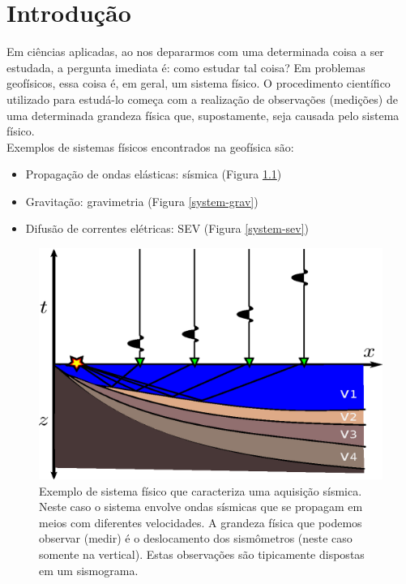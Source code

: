\chapter{Introdução}

\indent Em ciências aplicadas, ao nos depararmos com uma determinada coisa a ser
estudada, a pergunta imediata é: como estudar tal coisa? Em problemas geofísicos,
essa coisa é, em geral, um sistema físico. O procedimento científico utilizado
para estudá-lo começa com a realização de observações (medições) de uma
determinada grandeza física que, supostamente, seja causada pelo sistema físico.
\\
\indent Exemplos de sistemas físicos encontrados na geofísica são:

\begin{itemize}
    \item{Propagação de ondas elásticas: sísmica (Figura \ref{system-seismic})}
    \item{Gravitação: gravimetria (Figura \ref{system-grav})}
    \item{Difusão de correntes elétricas: SEV (Figura \ref{system-sev})}
\end{itemize}

\begin{figure}
    \centering
    \includegraphics[scale=1]{../figs/system-seismic.eps}
    \caption{Exemplo de sistema físico que caracteriza uma aquisição sísmica.
        Neste caso o sistema envolve ondas sísmicas que se propagam em meios com
        diferentes velocidades. A grandeza física que podemos observar (medir)
        é o deslocamento dos sismômetros (neste caso somente na vertical).
        Estas observações são tipicamente dispostas em um sismograma.}
    \label{system-seismic}
\end{figure}

